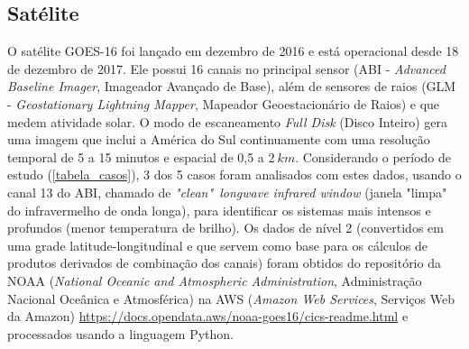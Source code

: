 \subsection{Satélite} \label{goes16}

O satélite GOES-16 foi lançado em dezembro de 2016 e está operacional desde 18 de dezembro de 2017. Ele possui 16 canais no principal sensor (ABI - \textit{Advanced Baseline Imager}, Imageador Avançado de Base), além de sensores de raios (GLM - \textit{Geostationary Lightning Mapper}, Mapeador Geoestacionário de Raios) e que medem atividade solar. O modo de escaneamento \textit{Full Disk} (Disco Inteiro) gera uma imagem que inclui a América do Sul continuamente com uma resolução temporal de 5 a 15 minutos e espacial de 0,5 a $2\:km$. Considerando o período de estudo (\autoref{tabela_casos}), 3 dos 5 casos foram analisados com estes dados, usando o canal 13 do ABI, chamado de \textit{"clean"\ longwave infrared window} (janela "limpa" do infravermelho de onda longa), para identificar os sistemas mais intensos e profundos (menor temperatura de brilho). Os dados de nível 2 (convertidos em uma grade latitude-longitudinal e que servem como base para os cálculos de produtos derivados de combinação dos canais) foram obtidos do repositório da NOAA (\textit{National Oceanic and Atmospheric Administration}, Administração Nacional Oceânica e Atmosférica) na AWS (\textit{Amazon Web Services}, Serviços Web da Amazon) \url{https://docs.opendata.aws/noaa-goes16/cics-readme.html} e processados usando a linguagem Python.